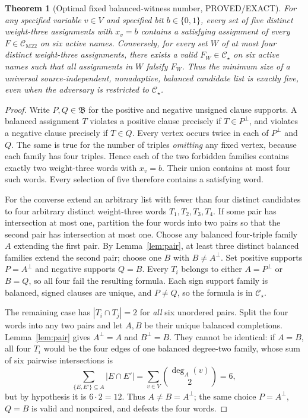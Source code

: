 \documentclass[11pt]{article}
\newtheorem{theorem}{Theorem}
\newcommand{\CM}{\mathcal C_{\mathrm{M22}}}
\newcommand{\CS}{\mathcal C_\star}
\begin{document}
\begin{theorem}[Optimal fixed balanced-witness number, PROVED/EXACT]\label{th:five}
For any specified variable $v\in V$ and specified bit $b\in\{0,1\}$, \emph{every} set of five distinct weight-three assignments with $x_v=b$ contains a satisfying assignment of \emph{every} $F\in\CM$ on six active names. Conversely, for \emph{every} set $W$ of at most four distinct weight-three assignments, there exists a valid $F_W\in\CS$ on six active names such that \emph{all} assignments in $W$ falsify $F_W$. Thus the minimum size of a universal \emph{source-independent, nonadaptive, balanced} candidate list is exactly five, even when the adversary is restricted to $\CS$.
\end{theorem}
\begin{proof}
Write $P,Q\in\mathfrak B$ for the positive and negative unsigned clause supports. A balanced assignment $T$ violates a positive clause precisely if $T\in P^\perp$, and violates a negative clause precisely if $T\in Q$. Every vertex occurs twice in each of $P^\perp$ and $Q$. The same is true for the number of triples \emph{omitting} any fixed vertex, because each family has four triples. Hence each of the two forbidden families contains exactly two weight-three words with $x_v=b$. Their union contains at most four such words. Every selection of five therefore contains a satisfying word.

For the converse extend an arbitrary list with fewer than four distinct candidates to four arbitrary distinct weight-three words $T_1,T_2,T_3,T_4$. If some pair has intersection at most one, partition the four words into two pairs so that the second pair has intersection at most one. Choose any balanced four-triple family $A$ extending the first pair. By Lemma~\ref{lem:pair}, at least three distinct balanced families extend the second pair; choose one $B$ with $B\ne A^\perp$. Set positive supports $P=A^\perp$ and negative supports $Q=B$. Every $T_i$ belongs to either $A=P^\perp$ or $B=Q$, so all four fail the resulting formula. Each sign support family is balanced, signed clauses are unique, and $P\ne Q$, so the formula is in $\CS$.

The remaining case has $|T_i\cap T_j|=2$ for \emph{all} six unordered pairs. Split the four words into any two pairs and let $A,B$ be their unique balanced completions. Lemma~\ref{lem:pair} gives $A^\perp=A$ and $B^\perp=B$. They cannot be identical: if $A=B$, all four $T_i$ would be the four edges of one balanced degree-two family, whose sum of six pairwise intersections is
\[
\sum_{\{E,E'\}\subseteq A}|E\cap E'|
=\sum_{v\in V}\binom{\deg_A(v)}2=6,
\]
but by hypothesis it is $6\cdot2=12$. Thus $A\ne B=A^\perp$; the same choice $P=A^\perp$, $Q=B$ is valid and nonpaired, and defeats the four words.
\end{proof}
\end{document}
